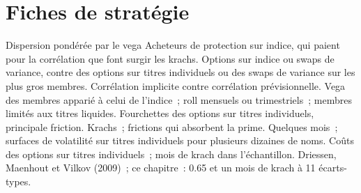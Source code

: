\begin{omfigure}

\label{fig:s2:dispersion-and-correlation:books}
\end{omfigure}

\section{Fiches de stratégie}

\begin{strategyfile}{Dispersion pondérée par le vega}\label{strat:s2:dispersion-and-correlation:vega}
 Acheteurs de protection sur indice, qui paient pour la corrélation que font surgir les krachs.
 Options sur indice ou swaps de variance, contre des options sur titres individuels ou des swaps de variance sur les plus gros membres.
 Corrélation implicite contre corrélation prévisionnelle.
 Vega des membres apparié à celui de l'indice~; roll mensuels ou trimestriels~; membres limités aux titres liquides.
 Fourchettes des options sur titres individuels, principale friction.
 Krachs~; frictions qui absorbent la prime.
 Quelques mois~; surfaces de volatilité sur titres individuels pour plusieurs dizaines de noms.
 Coûts des options sur titres individuels~; mois de krach dans l'échantillon.
 Driessen, Maenhout et Vilkov (2009)~; ce chapitre~: 0.65 et un mois de krach à 11 écarts-types.
\end{strategyfile}

